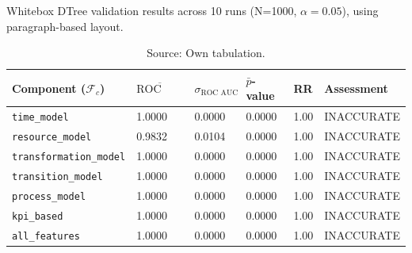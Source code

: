 \begin{table}[htbp]
  \centering
  \caption[Whitebox Model Results]{Whitebox DTree validation results across 10 runs (N=1000, $\alpha=0.05$), using paragraph-based layout.}
  \label{tab:results-whitebox}
  \begin{tabular}{l l l l l p{3cm}}
    \toprule
    \textbf{Component ($\mathcal{F}_c$)} & \textbf{$\overline{\text{ROC AUC}}$} & \textbf{$\sigma_{\text{ROC AUC}}$} & \textbf{$\bar{p}$-value} & \textbf{RR} & \textbf{Assessment} \\
    \midrule
    \texttt{time\_model}                 & 1.0000                               & 0.0000                             & 0.0000                   & 1.00        & INACCURATE          \\
    \texttt{resource\_model}             & 0.9832                               & 0.0104                             & 0.0000                   & 1.00        & INACCURATE          \\
    \texttt{transformation\_model}       & 1.0000                               & 0.0000                             & 0.0000                   & 1.00        & INACCURATE          \\
    \texttt{transition\_model}           & 1.0000                               & 0.0000                             & 0.0000                   & 1.00        & INACCURATE          \\
    \texttt{process\_model}              & 1.0000                               & 0.0000                             & 0.0000                   & 1.00        & INACCURATE          \\
    \texttt{kpi\_based}                  & 1.0000                               & 0.0000                             & 0.0000                   & 1.00        & INACCURATE          \\
    \texttt{all\_features}               & 1.0000                               & 0.0000                             & 0.0000                   & 1.00        & INACCURATE          \\
    \bottomrule
  \end{tabular}
  \caption*{Source: Own tabulation.}
\end{table}


